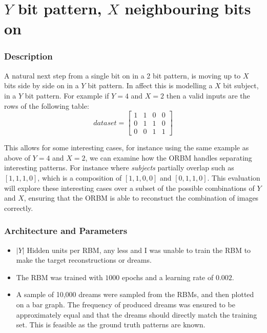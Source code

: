 \section{$Y$ bit pattern, $X$ neighbouring bits on} %

\subsubsection{Description}
A natural next step from a single bit on in a 2 bit pattern, is moving up to $X$  bits side by side on in a $Y$ bit pattern. In affect this is modelling a $X$ bit subject, in a $Y$ bit pattern.
For example if $Y = 4 $ and $ X = 2 $ then a valid inputs are the rows of the following table:
\begin{equation}\label{eq:Example-xy-dataset} dataset =
\begin{bmatrix}
  1 & 1 & 0 & 0 \\
  0 & 1 & 1 & 0 \\
  0 & 0 & 1 & 1
\end{bmatrix}
\end{equation}

This allows for some interesting cases, for instance using the same example as above of $Y = 4 $ and $ X = 2 $, we can examine how the ORBM handles separating interesting patterns. For instance where \emph{subjects} partially overlap such as $[1,1,1,0]$, which is a composition of $[1,1,0,0]$ and $[0,1,1,0]$. This evaluation will explore these interesting cases over a subset of the possible combinations of $Y$ and $X$, ensuring that the ORBM is able to reconstuct the combination of images correctly.


\subsubsection{Architecture and Parameters}
\begin{itemize}
  \item $|Y|$ Hidden units per RBM, any less and I was unable to train the RBM to make the target reconstructions or dreams.
  \item The RBM was trained with $1000$ epochs and a learning rate of $0.002$.
  \item A sample of 10,000 dreams were sampled from the RBMs, and then plotted on a bar graph. The frequency of produced dreams was ensured to be approximately equal and that the dreams should directly match the training set. This is feasible as the ground truth patterns are known.
\end{itemize}


